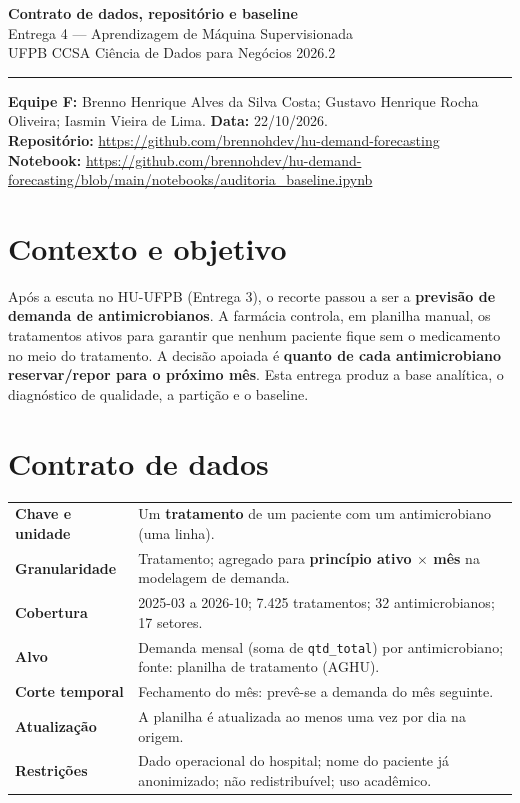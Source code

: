 \documentclass[11pt,a4paper]{article}
\begin{document}
\begin{center}
    {\LARGE\bfseries\color{azulmls} Contrato de dados, repositório e baseline}\\[3pt]
    {\large Entrega 4 --- Aprendizagem de Máquina Supervisionada}\\[2pt]
    {\normalsize UFPB \textperiodcentered{} CCSA \textperiodcentered{} Ciência de Dados para Negócios \textperiodcentered{} 2026.2}
\end{center}
\vspace{3pt}\hrule\vspace{6pt}

\noindent\textbf{Equipe F:} Brenno Henrique Alves da Silva Costa; Gustavo Henrique Rocha Oliveira; Iasmin Vieira de Lima. \quad \textbf{Data:} 22/10/2026.\\
\textbf{Repositório:} \url{https://github.com/brennohdev/hu-demand-forecasting}\\
\textbf{Notebook:} \url{https://github.com/brennohdev/hu-demand-forecasting/blob/main/notebooks/auditoria_baseline.ipynb}

\section{Contexto e objetivo}
Após a escuta no HU-UFPB (Entrega 3), o recorte passou a ser a \textbf{previsão de demanda de antimicrobianos}. A farmácia controla, em planilha manual, os tratamentos ativos para garantir que nenhum paciente fique sem o medicamento no meio do tratamento. A decisão apoiada é \textbf{quanto de cada antimicrobiano reservar/repor para o próximo mês}. Esta entrega produz a base analítica, o diagnóstico de qualidade, a partição e o baseline.

\section{Contrato de dados}
\begin{tabularx}{\textwidth}{@{}>{\bfseries}p{3.4cm} X@{}}
\toprule
Chave e unidade & Um \textbf{tratamento} de um paciente com um antimicrobiano (uma linha). \\
Granularidade & Tratamento; agregado para \textbf{princípio ativo $\times$ mês} na modelagem de demanda. \\
Cobertura & 2025-03 a 2026-10; 7.425 tratamentos; 32 antimicrobianos; 17 setores. \\
Alvo & Demanda mensal (soma de \texttt{qtd\_total}) por antimicrobiano; fonte: planilha de tratamento (AGHU). \\
Corte temporal & Fechamento do mês: prevê-se a demanda do mês seguinte. \\
Atualização & A planilha é atualizada ao menos uma vez por dia na origem. \\
Restrições & Dado operacional do hospital; nome do paciente já anonimizado; não redistribuível; uso acadêmico. \\
\bottomrule
\end{tabularx}
\end{document}
